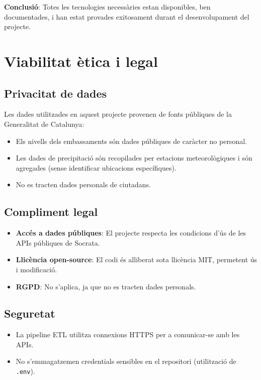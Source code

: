 \textbf{Conclusió}: Totes les tecnologies necessàries estan disponibles, ben documentades, i han estat provades exitosament durant el desenvolupament del projecte.


\section{Viabilitat ètica i legal}

\subsection{Privacitat de dades}

Les dades utilitzades en aquest projecte provenen de fonts públiques de la Generalitat de Catalunya:
\begin{itemize}
    \item Els nivells dels embassaments són dades públiques de caràcter no personal.
    \item Les dades de precipitació són recopilades per estacions meteorològiques i són agregades (sense identificar ubicacions específiques).
    \item No es tracten dades personals de ciutadans.
\end{itemize}

\subsection{Compliment legal}

\begin{itemize}
    \item \textbf{Accés a dades públiques}: El projecte respecta les condicions d'ús de les APIs públiques de Socrata.
    \item \textbf{Llicència open-source}: El codi és alliberat sota llicència MIT, permetent ús i modificació.
    \item \textbf{RGPD}: No s'aplica, ja que no es tracten dades personals.
\end{itemize}

\subsection{Seguretat}

\begin{itemize}
    \item La pipeline ETL utilitza connexions HTTPS per a comunicar-se amb les APIs.
    \item No s'emmagatzemen credentials sensibles en el repositori (utilització de \texttt{.env}).
\end{itemize}


